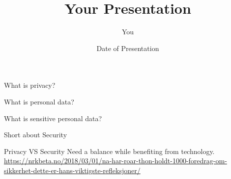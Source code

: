 \documentclass{beamer}
\title[Your Short Title]{Your Presentation}
\author{You}
\institute{Where You're From}
\date{Date of Presentation}
\begin{document}
\begin{frame}
  \titlepage
\end{frame}




%



\begin{frame}{What is privacy?}

\end{frame}


\begin{frame}{What is personal data?}

\end{frame}


\begin{frame}{What is sensitive personal data?}

\end{frame}


\begin{frame}{Short about Security}

\end{frame}


\begin{frame}{Privacy VS Security}
Need a balance while benefiting from technology.
\url{https://nrkbeta.no/2018/03/01/na-har-roar-thon-holdt-1000-foredrag-om-sikkerhet-dette-er-hans-viktigste-refleksjoner/}
\end{frame}
\end{document}

